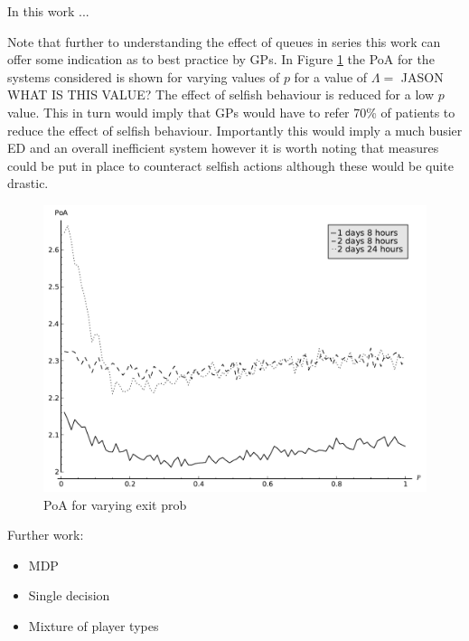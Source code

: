 \documentclass[12pt]{article}
\begin{document}
In this work ...

Note that further to understanding the effect of queues in series this work can offer some indication as to best practice by GPs.
In Figure \ref{anaexit} the PoA for the systems considered is shown for varying values of $p$ for a value of $\Lambda=$ JASON WHAT IS THIS VALUE?
The effect of selfish behaviour is reduced for a low $p$ value.
This in turn would imply that GPs would have to refer 70\% of patients to reduce the effect of selfish behaviour.
Importantly this would imply a much busier ED and an overall inefficient system however it is worth noting that measures could be put in place to counteract selfish actions although these would be quite drastic.

\begin{figure}[!hbtp]
    \begin{center}
        \includegraphics[width=.6\textwidth]{Images/AnaExit.pdf}
    \end{center}
    \caption{PoA for varying exit prob}\label{anaexit}
\end{figure}

Further work:

\begin{itemize}
    \item MDP
    \item Single decision
    \item Mixture of player types
\end{itemize}

\pagebreak


\end{document}
